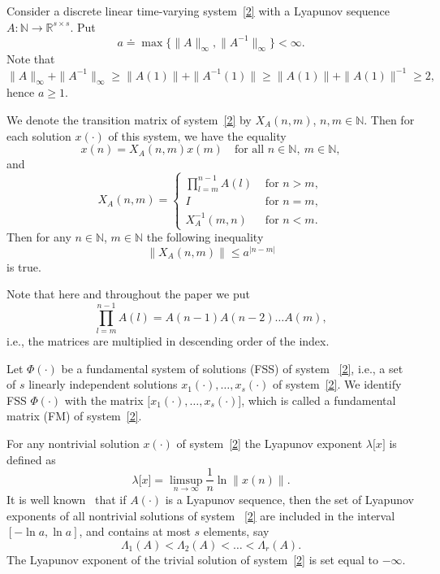 \documentclass[11pt]{article}
\begin{document}
Consider a discrete linear time-varying system~\eqref{2} with a Lyapunov
sequence $A\colon \mathbb{N}\to \mathbb{R}^{s\times s}$. Put 
\begin{equation*}
a\doteq \max \bigl\{\| A\| _{\infty },\| A^{-1}\| _{\infty }%
\bigr\}<\infty .
\end{equation*}%
Note that 
\begin{equation*}
\| A\| _{\infty }+\| A^{-1}\| _{\infty }\ge \| A(1)\|
+\| A^{-1}(1)\| 
\ge \| A(1)\| +\| A(1)\| ^{-1}\ge 2,
\end{equation*}%
hence $a\ge 1$.

We denote the transition matrix of system~\eqref{2} by $X_{A}(n,m)$, $n,m\in 
\mathbb{N}$. Then \cite[p.\,13--14]{GAI} for each solution $x(\cdot )$ of
this system, we have the equality%
\begin{equation*}
x(n)=X_{A}(n,m)x(m)\quad \text{for all\ }n\in \mathbb{N},\ m\in \mathbb{N},
\end{equation*}%
and 
\begin{equation*}
X_{A}(n,m)=\left\{ 
\begin{array}{ll}
\prod\limits_{l=m}^{n-1}A(l) & \text{ for\ }n>m, \\ 
I & \text{ for\ }n=m, \\ 
X_{A}^{-1}(m,n) & \text{ for\ }n<m.%
\end{array}%
\right.
\end{equation*}%
Then for any $n\in \mathbb{N}$, $m\in \mathbb{N}$ the following inequality%
\begin{equation}
\| X_{A}(n,m)\| \leqslant a^{|n-m|}  \label{otsMK}
\end{equation}%
is true.

Note that here and 
throughout the paper we put 
\begin{equation*}
{\prod\limits_{l=m}^{n-1}A(l)=A(n-1)A(n-2)\ldots A(m)},
\end{equation*}%
i.e., the matrices are multiplied in descending order of the index.

Let $\Phi (\cdot )$ be a fundamental system of solutions (FSS) of system~%
\eqref{2}, i.e., a set of $s$ linearly independent solutions $x_{1}(\cdot
),\dots ,x_{s}(\cdot )$ of system~\eqref{2}. We identify FSS $\Phi(\cdot)$ with the matrix 
$\bigl[ x_{1}(\cdot ),\dots ,x_{s}(\cdot )\bigr] $, which is called a 
fundamental matrix (FM)  of system~\eqref{2}.

For any nontrivial solution $x(\cdot )$ of system~\eqref{2} the Lyapunov
exponent $\lambda \lbrack x]$ is defined as 
\begin{equation*}
\lambda \lbrack x]=\limsup_{n\to \infty }\frac{1}{n}\ln \|
x(n)\| .
\end{equation*}%
It is well known~\cite{Barreira} that if $A(\cdot )$ is a Lyapunov sequence,
then the set of Lyapunov exponents of all nontrivial solutions of system~%
\eqref{2} are included in the 
interval $[-\ln a,\ln a]$, 
and 
contains at most $s$ 
elements, say 
\begin{equation*}
\Lambda _{1}(A)<\Lambda _{2}(A)<\ldots <\Lambda _{r}(A).
\end{equation*}%
The Lyapunov exponent of the trivial solution of system~\eqref{2} is set
equal to $-\infty $.
\end{document}
